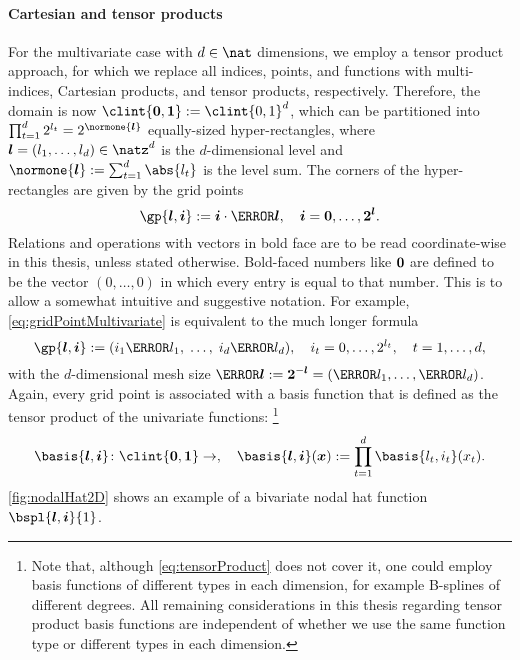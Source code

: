 \paragraph{Cartesian and tensor products}

For the multivariate case with $d \in \nat$ dimensions,
we employ a tensor product approach,
for which we replace all indices, points, and functions with
multi-indices, Cartesian products, and tensor products, respectively.
Therefore, the domain is now $\clint{\*0, \*1} := \clint{0, 1}^d$,
which can be partitioned into
$\prod_{t=1}^d 2^{l_t} = 2^{\normone{\vec{l}}}$ equally-sized hyper-rectangles,
where $\*l = (l_1, \dotsc, l_d) \in \natz^d$ is the $d$-dimensional level
and $\normone{\vec{l}} := \sum_{t=1}^d \abs{l_t}$ is the level sum.
The corners of the hyper-rectangles are given by the grid points
\begin{equation}
  \label{eq:gridPointMultivariate}
  \gp{\*l,\*i} := \*i \cdot \ms{\*l},\quad
  \*i = \*0, \dotsc, \*2^{\*l}.
\end{equation}
Relations and operations with vectors in bold face
are to be read coordinate-wise in this thesis, unless stated otherwise.
Bold-faced numbers like ${\boldsymbol{0}}$ are defined to be the vector $(0, \dotsc, 0)$
in which every entry is equal to that number.
This is to allow a somewhat intuitive and suggestive notation.
For example, \eqref{eq:gridPointMultivariate} is equivalent to
the much longer formula
\begin{equation}
  \gp{\*l,\*i}
  := (i_1 \ms{l_1},\; \dotsc,\; i_d \ms{l_d}),\quad
  i_t = 0, \dotsc, 2^{l_t},\quad
  t = 1, \dotsc, d,
\end{equation}
with the $d$-dimensional mesh size
$\ms{\*l} := \*2^{-\*l} = (\ms{l_1}, \dotsc, \ms{l_d})$.
Again, every grid point is associated with a basis function that is defined
as the tensor product of the univariate functions:%
\footnote{%
  Note that,
  although \cref{eq:tensorProduct} does not cover it,
  one could employ basis functions of different types in
  each dimension, for example B-splines of different degrees.
  All remaining considerations in this thesis
  regarding tensor product basis functions are independent
  of whether we use the same function type or
  different types in each dimension.%
}
\begin{equation}
  \label{eq:tensorProduct}
  \basis{\*l,\*i}\colon \clint{\*0, \*1} \to \real,\quad
  \basis{\*l,\*i}(\*x)
  := \prod_{t=1}^d \basis{l_t,i_t}(x_t).
\end{equation}
\cref{fig:nodalHat2D} shows an example of a bivariate nodal hat function
$\bspl{\*l,\*i}{1}$.

